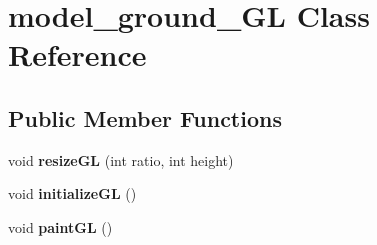 \hypertarget{classmodel__ground__GL}{\section{model\-\_\-ground\-\_\-\-G\-L Class Reference}
\label{classmodel__ground__GL}
}
\subsection*{Public Member Functions}
\begin{DoxyCompactItemize}
\item 
\hypertarget{classmodel__ground__GL_a469f82ae7c86a5e3c9dbea525ca542b8}{void {\bfseries resize\-G\-L} (int ratio, int height)}\label{classmodel__ground__GL_a469f82ae7c86a5e3c9dbea525ca542b8}

\item 
\hypertarget{classmodel__ground__GL_a462d82d645c6bc86c00c046566a6053d}{void {\bfseries initialize\-G\-L} ()}\label{classmodel__ground__GL_a462d82d645c6bc86c00c046566a6053d}

\item 
\hypertarget{classmodel__ground__GL_aed145fa9a67caebd84374a1607be3af1}{void {\bfseries paint\-G\-L} ()}\label{classmodel__ground__GL_aed145fa9a67caebd84374a1607be3af1}


\end{DoxyCompactItemize}
